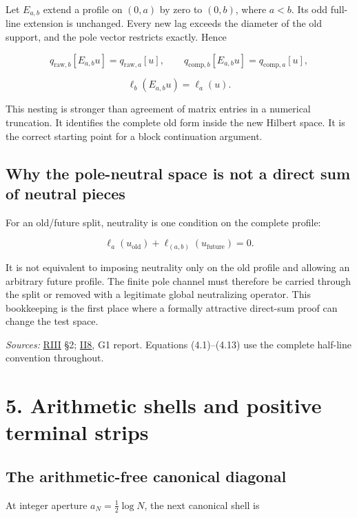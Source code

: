 \documentclass[
  10pt,
  a4paper,
  10pt,
  oneside,
  openany]{book}
\begin{document}
Let \(E_{a,b}\) extend a profile on \((0,a)\) by zero to \((0,b)\),
where \(a<b\). Its odd full-line extension is unchanged. Every new lag
exceeds the diameter of the old support, and the pole vector restricts
exactly. Hence

\[
q_{\mathrm{raw},b}[E_{a,b}u]=q_{\mathrm{raw},a}[u],
\qquad
q_{\mathrm{comp},b}[E_{a,b}u]=q_{\mathrm{comp},a}[u],
\tag{4.11}\label{eq:4.11}
\]

\[
\ell_b(E_{a,b}u)=\ell_a(u).
\tag{4.12}\label{eq:4.12}
\]

This nesting is stronger than agreement of matrix entries in a numerical
truncation. It identifies the complete old form inside the new Hilbert
space. It is the correct starting point for a block continuation
argument.

\subsection{Why the pole-neutral space is not a direct sum of neutral
pieces}\label{why-the-pole-neutral-space-is-not-a-direct-sum-of-neutral-pieces}

For an old/future split, neutrality is one condition on the complete
profile:

\[
\ell_a(u_{\mathrm{old}})+\ell_{(a,b)}(u_{\mathrm{future}})=0.
\tag{4.13}\label{eq:4.13}
\]

It is not equivalent to imposing neutrality only on the old profile and
allowing an arbitrary future profile. The finite pole channel must
therefore be carried through the split or removed with a legitimate
global neutralizing operator. This bookkeeping is the first place where
a formally attractive direct-sum proof can change the test space.

\emph{Sources:} \hyperref[source-riii]{RIII} §2;
\hyperref[source-ii8]{II8}, G1 report. Equations (4.1)--(4.13) use the
complete half-line convention throughout.

\section{5. Arithmetic shells and positive terminal
strips}\label{ch-strips}

\subsection{The arithmetic-free canonical
diagonal}\label{the-arithmetic-free-canonical-diagonal}

At integer aperture \(a_N=\frac12\log N\), the next canonical shell is
\end{document}
